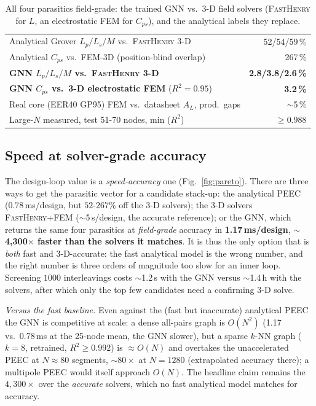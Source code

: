 \documentclass[letterpaper,twocolumn,9pt]{extarticle}
\begin{document}
\begin{table}[t]
\caption{All four parasitics field-grade: the trained GNN vs.\ 3-D field solvers
(\textsc{FastHenry} for $L$, an electrostatic FEM for $C_{ps}$), and the
analytical labels they replace.}
\label{tab:fieldgrade}
\centering
\small
\begin{tabular}{lr}
\toprule
Analytical Grover $L_p/L_s/M$ vs.\ \textsc{FastHenry} 3-D        & 52/54/59\,\%\\
Analytical $C_{ps}$ vs.\ FEM-3D (position-blind overlap)          & 267\,\%\\
\midrule
\textbf{GNN $L_p/L_s/M$ vs.\ \textsc{FastHenry} 3-D}            & \textbf{2.8/3.8/2.6\,\%}\\
\textbf{GNN $C_{ps}$ vs.\ 3-D electrostatic FEM} ($R^2{=}0.95$)   & \textbf{3.2\,\%}\\
Real core (EER40 GP95) FEM vs.\ datasheet $A_L$, prod.\ gaps       & $\sim$5\,\%\\
Large-$N$ measured, test 51-70 nodes, min ($R^2$)                 & $\ge0.988$\\
\bottomrule
\end{tabular}
\end{table}

\subsection{Speed at solver-grade accuracy}
\label{sec:scaling}
The design-loop value is a \emph{speed-accuracy} one (Fig.~\ref{fig:pareto}).
There are three ways to get the parasitic vector for a candidate stack-up: the
analytical PEEC (0.78\,ms/design, but $52$-$267\%$ off the 3-D solvers); the 3-D
solvers \textsc{FastHenry}+FEM ($\sim$5\,s/design, the accurate reference); or the
GNN, which returns the same four parasitics at \emph{field-grade} accuracy in
\textbf{1.17\,ms/design}, $\sim$\textbf{4{,}300$\times$ faster than the solvers it
matches}. It is thus the only option that is \emph{both} fast and 3-D-accurate:
the fast analytical model is the wrong number, and the right number is three
orders of magnitude too slow for an inner loop. Screening $1000$ interleavings
costs $\sim$1.2\,s with the GNN versus $\sim$1.4\,h with the solvers, after which
only the top few candidates need a confirming 3-D solve.

\emph{Versus the fast baseline.} Even against the (fast but inaccurate) analytical
PEEC the GNN is competitive at scale: a dense all-pairs graph is $O(N^2)$ (1.17
vs.\ 0.78\,ms at the 25-node mean, the GNN slower), but a sparse $k$-NN graph
($k=8$, retrained, $R^2\ge0.992$) is $\approx O(N)$ and overtakes the
unaccelerated PEEC at $N\!\approx\!80$ segments, $\sim80\times$ at $N=1280$
(extrapolated accuracy there); a multipole PEEC would itself approach $O(N)$. The
headline claim remains the $4{,}300\times$ over the \emph{accurate} solvers, which
no fast analytical model matches for accuracy.
\end{document}
